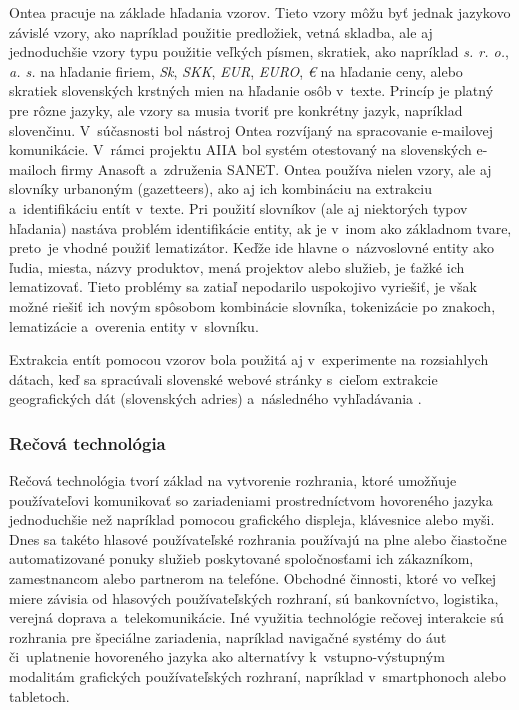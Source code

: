 \begin{multicols}{2}
Ontea pracuje na základe hľadania vzorov. Tieto vzory môžu byť
jednak jazykovo závislé vzory, ako napríklad použitie predložiek,
vetná skladba, ale aj jednoduchšie vzory typu použitie veľkých
písmen, skratiek, ako napríklad \emph{s. r. o.}, \emph{a. s.} na
hľadanie firiem, \emph{Sk}, \emph{SKK}, \emph{EUR}, \emph{EURO},
\emph{€} na hľadanie ceny, alebo skratiek slovenských krstných
mien na hľadanie osôb v~texte. Princíp je platný pre rôzne jazyky,
ale vzory sa musia tvoriť pre konkrétny jazyk, napríklad slovenčinu.
V~súčasnosti bol nástroj Ontea rozvíjaný na spracovanie e-mailovej
komunikácie. V~rámci projektu
AIIA\cite{f29} \cite{laclavik2010} bol
systém otestovaný na slovenských e-mailoch firmy Anasoft a~združenia
SANET. Ontea používa nielen vzory, ale aj slovníky urbanoným
(gazetteers), ako aj ich kombináciu na extrakciu a~identifikáciu
entít v~texte. Pri použití slovníkov (ale aj niektorých typov
hľadania) nastáva problém identifikácie entity, ak je v~inom ako
základnom tvare, preto~je vhodné použiť lematizátor. Keďže ide
hlavne o~názvoslovné entity ako ľudia, miesta, názvy produktov,
mená projektov alebo služieb, je ťažké ich lematizovať. Tieto
problémy sa zatiaľ nepodarilo uspokojivo vyriešiť, je však možné
riešiť ich novým spôsobom kombinácie slovníka, tokenizácie po
znakoch, lematizácie a~overenia entity v~slovníku.

Extrakcia entít pomocou vzorov bola použitá aj v~experimente na rozsiahlych dátach, keď sa spracúvali slovenské webové stránky s~cieľom extrakcie geografických dát (slovenských adries) a~následného vyhľadávania \cite{dlugolinsky2010}.

\subsubsection{Rečová technológia}
Rečová technológia tvorí základ na vytvorenie rozhrania, ktoré umožňuje používateľovi komunikovať so zariadeniami prostredníctvom hovoreného jazyka jednoduchšie než napríklad pomocou grafického displeja, klávesnice alebo myši. Dnes sa takéto hlasové používateľské rozhrania používajú na plne alebo čiastočne automatizované ponuky služieb poskytované spoločnosťami ich zákazníkom, zamestnancom alebo partnerom na telefóne. Obchodné činnosti, ktoré vo veľkej miere závisia od hlasových používateľských rozhraní, sú bankovníctvo, logistika, verejná doprava a~telekomunikácie. Iné využitia technológie rečovej interakcie sú rozhrania pre špeciálne zariadenia, napríklad navigačné systémy do  áut či~uplatnenie hovoreného jazyka ako alternatívy k~vstupno-výstupným modalitám grafických používateľských rozhraní, napríklad v~smartphonoch alebo tabletoch. 


\end{multicols}
